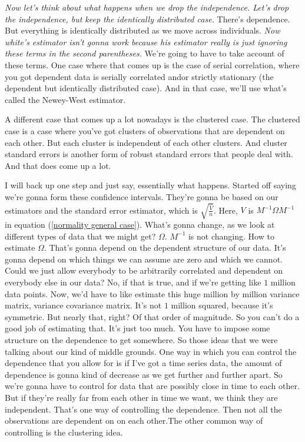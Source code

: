 \documentclass[11pt,a4paper]{amsart}
\theoremstyle{plain}
\theoremstyle{definition}
\begin{document}
   		 	 \emph{Now let's think about what happens when we drop the independence. Let's drop the independence, but keep the identically distributed case.} There's dependence. But everything is identically distributed as we move across individuals. \emph{Now white's estimator isn't gonna work because his estimator really is just ignoring these terms in the second parentheses.} We're going to have to take account of these terms. One case where that comes up is the case of serial correlation, where you got dependent data is serially correlated andor strictly stationary (the dependent but identically distributed case). And in that case, we'll use what's called the Newey-West estimator.\par 
   		 	 A different case that comes up a lot nowadays is the clustered case.  The clustered case is a case where you've got clusters of observations that are dependent on each other. But each cluster is independent of each other clusters. And cluster standard errors is another form of robust standard errors that people deal with. And that does come up a lot.\par 
   		 	 I will back up one step and just say, essentially what happens. Started off saying we're gonna form these confidence intervals. They're gonna be based on our estimators and the standard error estimator, which is $\sqrt{\frac{\hat{V}}{n}}$. Here, $V$ is $M^{-1}\Omega M^{-1}$ in equation (\ref{normality general case}). What's gonna change, as we look at different types of data that we might get? $\Omega$. $M^{-1}$ is not changing. How to estimate $\Omega$. That's gonna depend on the dependent structure of our data. It's gonna depend on which things we can assume are zero and which we cannot. Could we just allow everybody to be arbitrarily correlated and dependent on everybody else in our data? No, if that is true, and if we're getting like $1$ million data points. Now, we'd have to like estimate this huge million by million variance matrix, variance covariance matrix. It's not $1$ million squared, because it's symmetric. But nearly that, right? Of that order of magnitude. So you can't do a good job of estimating that. It's just too much. You have to impose some structure on the dependence to get somewhere.  So those ideas that we were talking about our kind of middle grounds. One way in which you can control the dependence that you allow for is if I've got a time series data, the amount of dependence is gonna kind of decrease as we get further and further apart. So we're gonna have to control for data that are possibly close in time to each other. But if they're really far from each other in time we want, we think they are independent. That's one way of controlling the dependence. Then not all the observations are dependent on on each other.The other common way of controlling is the clustering idea.\par 
\end{document}
